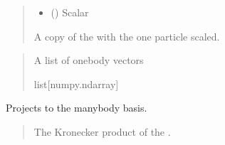 \documentclass[letterpaper,10pt,english]{sphinxmanual}
\begin{document}
\begin{fulllineitems}
\begin{fulllineitems}
\begin{quote}
\begin{description}
\begin{itemize}
\item {} 
\sphinxAtStartPar
{} () \textendash{} Scalar

\end{itemize}

\sphinxAtStartPar
A copy of the  with the one particle scaled.

\sphinxAtStartPar
{\hyperref[\detokenize{spinbox:spinbox.core.ProductState}]{}}

\end{description}\end{quote}

\end{fulllineitems}


\begin{fulllineitems}
\label{\detokenize{spinbox:spinbox.core.ProductState.to_list}}
\pysigstartsignatures
{}
\pysigstopsignatures\begin{quote}\begin{description}
\sphinxAtStartPar
A list of one\sphinxhyphen{}body vectors

\sphinxAtStartPar
list{[}numpy.ndarray{]}

\end{description}\end{quote}

\end{fulllineitems}


\begin{fulllineitems}
\label{\detokenize{spinbox:spinbox.core.ProductState.to_manybody_basis}}
\pysigstartsignatures
{}
\pysigstopsignatures
\sphinxAtStartPar
Projects to the many\sphinxhyphen{}body basis.
\begin{quote}\begin{description}
\sphinxAtStartPar
The Kronecker product of the .


\end{description}
\end{quote}
\end{fulllineitems}
\end{fulllineitems}
\end{document}
